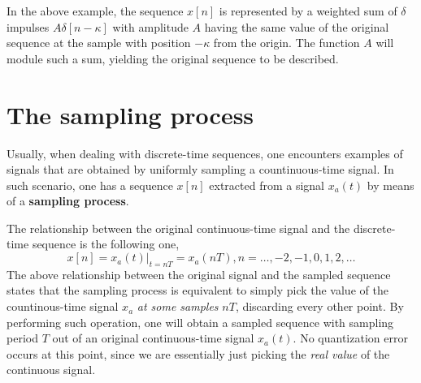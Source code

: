 \documentclass[\documentfontsize, twocolumn]{\classname}
\begin{document}
\begin{center}
\end{center}

In the above example, the se\-quen\-ce $x[n]$ is represented by a weighted sum of $\delta$ impulses $A\delta[n-\kappa]$ with amplitude $A$ having the same value of the original se\-quen\-ce at the sample with position $-\kappa$ from the origin. The function $A$ will module such a sum, yielding the original sequence to be described.


\section{The sampling process}

Usually, when dealing with discrete-time se\-quen\-ces, one encounters examples of signals that are obtained by uniformly sampling a countinuous-time signal. In such scenario, one has a se\-quen\-ce $x[n]$ extracted from a signal $x_a(t)$ by means of a \textbf{sampling process}.

The relationship between the original con\-ti\-nuo\-us-time signal and the discrete-time se\-quen\-ce is the following one,
\[
    x[n] = x_a(t)\Bigr\rvert_{t=nT} = x_a(nT), n = \dots,-2,-1,0,1,2,\dots
\]
The above relationship between the original signal and the sampled se\-quen\-ce states that the sampling process is equivalent to simply pick the value of the countinous-time signal $x_a$ \emph{at some samples} $nT$, discarding every other point. By performing such operation, one will obtain a sampled se\-quen\-ce with sampling period $T$ out of an original continuous-time signal $x_a(t)$. No quantization error occurs at this point, since we are essentially just picking the \emph{real value} of the continuous signal.
\end{document}
